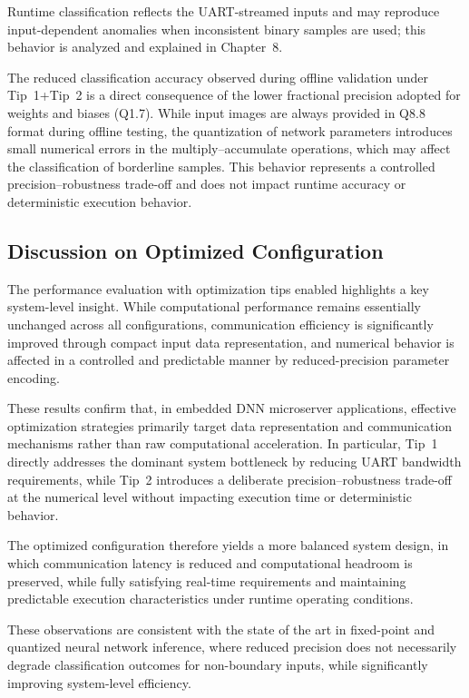 Runtime classification reflects the UART-streamed inputs and may reproduce
input-dependent anomalies when inconsistent binary samples are used; this
behavior is analyzed and explained in Chapter~8.


The reduced classification accuracy observed during offline validation under
Tip~1+Tip~2 is a direct consequence of the lower fractional precision adopted for
weights and biases (Q1.7).
While input images are always provided in Q8.8 format during offline testing,
the quantization of network parameters introduces small numerical errors in the
multiply--accumulate operations, which may affect the classification of
borderline samples.
This behavior represents a controlled precision--robustness trade-off and does
not impact runtime accuracy or deterministic execution behavior.



\subsection{Discussion on Optimized Configuration}

The performance evaluation with optimization tips enabled highlights a key
system-level insight.
While computational performance remains essentially unchanged across all
configurations, communication efficiency is significantly improved through
compact input data representation, and numerical behavior is affected in a
controlled and predictable manner by reduced-precision parameter encoding.

These results confirm that, in embedded DNN microserver applications,
effective optimization strategies primarily target data representation and
communication mechanisms rather than raw computational acceleration.
In particular, Tip~1 directly addresses the dominant system bottleneck by
reducing UART bandwidth requirements, while Tip~2 introduces a deliberate
precision--robustness trade-off at the numerical level without impacting
execution time or deterministic behavior.

The optimized configuration therefore yields a more balanced system design,
in which communication latency is reduced and computational headroom is
preserved, while fully satisfying real-time requirements and maintaining
predictable execution characteristics under runtime operating conditions.

These observations are consistent with the state of the art in fixed-point and
quantized neural network inference, where reduced precision does not necessarily
degrade classification outcomes for non-boundary inputs, while significantly
improving system-level efficiency.



